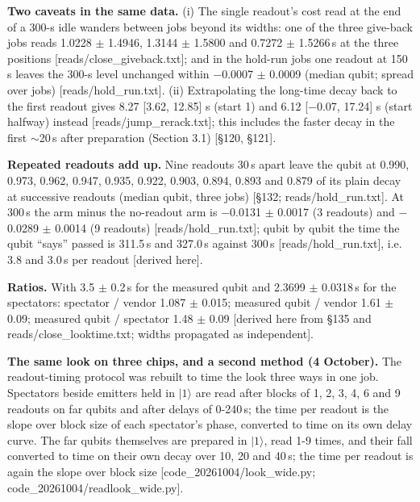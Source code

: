 \documentclass[11pt]{article}
\begin{document}
\textbf{Two caveats in the same data.} (i) The single readout's cost read at the end of a 300-\textmu s idle wanders between jobs beyond its widths: one of the three give-back jobs reads 1.0228 \(\pm\) 1.4946, 1.3144 \(\pm\) 1.5800 and 0.7272 \(\pm\) 1.5266\,\textmu s at the three positions {[}reads/close\_giveback.txt{]}; and in the hold-run jobs one readout at 150\,\textmu s leaves the 300-\textmu s level unchanged within \(-\)0.0007 \(\pm\) 0.0009 (median qubit; spread over jobs) {[}reads/hold\_run.txt{]}. (ii) Extrapolating the long-time decay back to the first readout gives 8.27 {[}3.62, 12.85{]} \textmu s (start 1) and 6.12 {[}\(-\)0.07, 17.24{]} \textmu s (start halfway) instead {[}reads/jump\_rerack.txt{]}; this includes the faster decay in the first \(\sim\)20\,\textmu s after preparation (Section 3.1) {[}\S{}120, \S{}121{]}.

\textbf{Repeated readouts add up.} Nine readouts 30\,\textmu s apart leave the qubit at 0.990, 0.973, 0.962, 0.947, 0.935, 0.922, 0.903, 0.894, 0.893 and 0.879 of its plain decay at successive readouts (median qubit, three jobs) {[}\S{}132; reads/hold\_run.txt{]}. At 300\,\textmu s the arm minus the no-readout arm is \(-\)0.0131 \(\pm\) 0.0017 (3 readouts) and \(-\)0.0289 \(\pm\) 0.0014 (9 readouts) {[}reads/hold\_run.txt{]}; qubit by qubit the time the qubit ``says'' passed is 311.5\,\textmu s and 327.0\,\textmu s against 300\,\textmu s {[}reads/hold\_run.txt{]}, i.e. 3.8 and 3.0\,\textmu s per readout {[}derived here{]}.

\textbf{Ratios.} With 3.5 \(\pm\) 0.2\,\textmu s for the measured qubit and 2.3699 \(\pm\) 0.0318\,\textmu s for the spectators: spectator / vendor 1.087 \(\pm\) 0.015; measured qubit / vendor 1.61 \(\pm\) 0.09; measured qubit / spectator 1.48 \(\pm\) 0.09 {[}derived here from \S{}135 and reads/close\_looktime.txt; widths propagated as independent{]}.

\textbf{The same look on three chips, and a second method (4 October).} The readout-timing protocol was rebuilt to time the look three ways in one job. Spectators beside emitters held in \(|1\rangle\) are read after blocks of 1, 2, 3, 4, 6 and 9 readouts on far qubits and after delays of 0-240\,\textmu s; the time per readout is the slope over block size of each spectator's phase, converted to time on its own delay curve. The far qubits themselves are prepared in \(|1\rangle\), read 1-9 times, and their fall converted to time on their own decay over 10, 20 and 40\,\textmu s; the time per readout is again the slope over block size {[}code\_20261004/look\_wide.py; code\_20261004/readlook\_wide.py{]}.
\end{document}
